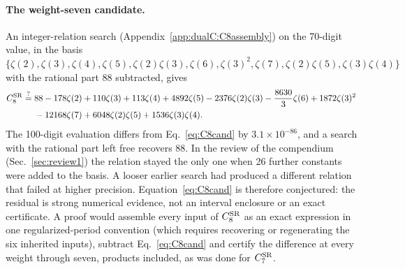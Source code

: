 \documentclass[11pt,a4paper]{article}
\numberwithin{equation}{section}
\newcommand{\CSR}{C^{\rm SR}}
\newcommand{\sci}[2]{#1\times10^{#2}}
\begin{document}
\paragraph{The weight-seven candidate.} An integer-relation search (Appendix~\ref{app:dualC:C8assembly}) on the
70-digit value, in the basis
$\{\zeta(2),\zeta(3),\zeta(4),\zeta(5),\zeta(2)\zeta(3),\zeta(6),\zeta(3)^2,\zeta(7),\zeta(2)\zeta(5),\zeta(3)\zeta(4)\}$
with the rational part 88 subtracted, gives
\begin{equation}
\begin{aligned}
 \CSR_8\overset{?}{=}{}&88-178\zeta(2)+110\zeta(3)+113\zeta(4)+4892\zeta(5)-2376\zeta(2)\zeta(3)-\frac{8630}{3}\zeta(6)
 +1872\zeta(3)^2\\
 &-12168\zeta(7)+6048\zeta(2)\zeta(5)+1536\zeta(3)\zeta(4).
\end{aligned}
\label{eq:C8cand}
\end{equation}
The 100-digit evaluation differs from Eq.~\eqref{eq:C8cand} by $\sci{3.1}{-86}$, and a search with the rational
part left free recovers 88. In the review of the compendium (Sec.~\ref{sec:review1}) the relation stayed the only
one when 26 further constants were added to the basis. A looser earlier search had produced a different relation
that failed at higher precision. Equation~\eqref{eq:C8cand} is therefore conjectured: the residual is strong
numerical evidence, not an interval enclosure or an exact certificate. A proof would assemble every input of
$\CSR_8$ as an exact expression in one regularized-period convention (which requires recovering or regenerating the
six inherited inputs), subtract Eq.~\eqref{eq:C8cand} and certify the difference at every weight through seven,
products included, as was done for $\CSR_7$.
\end{document}
